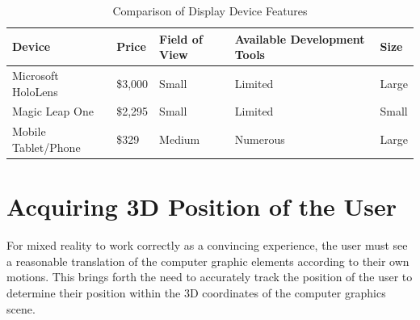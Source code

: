 \documentclass[10pt,draftclsnofoot,onecolumn,letterpaper]{IEEEtran}
\begin{document}
\begin{table}[ht]
\begin{center}
\caption{Comparison of Display Device Features}
\label{table:1}
 \begin{tabular}{|p{3cm}|p{1cm}|p{2cm}|p{5cm}|p{2cm}|} 
 \hline
 Device & Price & Field of View & Available Development Tools & Size \\ [0.5ex] 
 \hline\hline
 Microsoft HoloLens & \$3,000 & Small & Limited & Large \\ 
 \hline
 Magic Leap One & \$2,295 & Small & Limited & Small \\
 \hline
 Mobile Tablet/Phone & \$329 & Medium & Numerous & Large \\
 \hline
\end{tabular}
\end{center}
\end{table}

\section{Acquiring 3D Position of the User}
For mixed reality to work correctly as a convincing experience, the user must see a reasonable translation of the computer graphic elements according to their own motions. This brings forth the need to accurately track the position of the user to determine their position within the 3D coordinates of the computer graphics scene.\par
\end{document}
